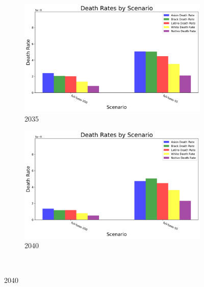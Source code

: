 \documentclass[a4paper]{article}
\theoremstyle{definition}
\theoremstyle{plain}
\begin{document}
\begin{figure}
        \begin{subfigure}[b]{0.45\textwidth}
        \includegraphics[width=\textwidth]{Figures/Output/ISRM_deathrate_by_scenario_2030.jpg}
        \caption{2035}
        \label{Subfig2}
    \end{subfigure}
    \hfill
        \begin{subfigure}[b]{0.45\textwidth}
        \includegraphics[width=\textwidth]{Figures/Output/ISRM_deathrate_by_scenario_2035.jpg}
        \caption{2040}
        \label{Subfig2}
    \end{subfigure}\\


\end{figure}
\end{document}
